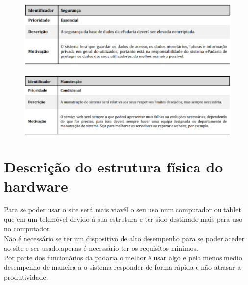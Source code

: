 \begin{figure}[h]
	\centering
	\includegraphics{requisito_nao_funcional5}
	\caption{}
	\label{fig:requisitonaofuncional5}
\end{figure}

\begin{figure}[h]
	\centering
	\includegraphics{requisito_nao_funcional6}
	\caption{}
	\label{fig:requisitonaofuncional6}
\end{figure}

\section{Descrição do estrutura física do hardware}
Para se poder usar o site será mais viavél o seu uso num computador ou tablet que em um telemóvel devido á sua estrutura e ter sido destinado mais para uso no computador. \\
Não é necessário se ter um dispositivo de alto desempenho para se poder aceder ao site e ser usado,apenas é necessário ter os requisitos minimos.\\
Por parte dos funcionários da padaria o melhor é usar algo e pelo menos médio desempenho de maneira a o sistema responder de forma rápida e não atrasar a produtividade.

